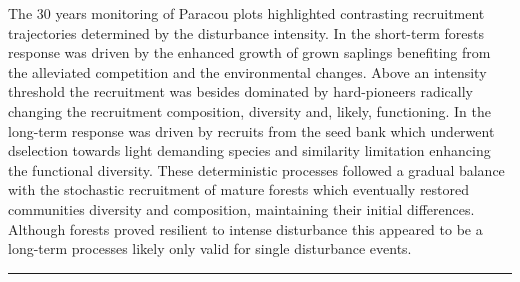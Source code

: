 \documentclass[fleqn,10pt]{ArtEcoFoG} %
\begin{document}
The 30 years monitoring of Paracou plots highlighted contrasting
recruitment trajectories determined by the disturbance intensity. In the
short-term forests response was driven by the enhanced growth of grown
saplings benefiting from the alleviated competition and the
environmental changes. Above an intensity threshold the recruitment was
besides dominated by hard-pioneers radically changing the recruitment
composition, diversity and, likely, functioning. In the long-term
response was driven by recruits from the seed bank which underwent
dselection towards light demanding species and similarity limitation
enhancing the functional diversity. These deterministic processes
followed a gradual balance with the stochastic recruitment of mature
forests which eventually restored communities diversity and composition,
maintaining their initial differences. Although forests proved resilient
to intense disturbance this appeared to be a long-term processes likely
only valid for single disturbance events.

\begin{center}\rule{0.5\linewidth}{\linethickness}\end{center}





\end{document}
